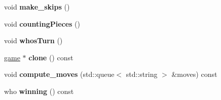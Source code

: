 \begin{DoxyCompactItemize}
\item 
void {\bfseries make\+\_\+skips} ()\hypertarget{classmain__savitch__14_1_1_othello_a3177234195a490eef52343d957e64b5d}{}\label{classmain__savitch__14_1_1_othello_a3177234195a490eef52343d957e64b5d}

\item 
void {\bfseries counting\+Pieces} ()\hypertarget{classmain__savitch__14_1_1_othello_a19f49edfbe82b84922877e00bc854ed8}{}\label{classmain__savitch__14_1_1_othello_a19f49edfbe82b84922877e00bc854ed8}

\item 
void {\bfseries whos\+Turn} ()\hypertarget{classmain__savitch__14_1_1_othello_a21440dbb4511812a76c578a5f546710b}{}\label{classmain__savitch__14_1_1_othello_a21440dbb4511812a76c578a5f546710b}

\item 
\hyperlink{classmain__savitch__14_1_1game}{game} $\ast$ {\bfseries clone} () const \hypertarget{classmain__savitch__14_1_1_othello_ab5a505f8a6ffd860376bf074c57e8a5f}{}\label{classmain__savitch__14_1_1_othello_ab5a505f8a6ffd860376bf074c57e8a5f}

\item 
void {\bfseries compute\+\_\+moves} (std\+::queue$<$ std\+::string $>$ \&moves) const \hypertarget{classmain__savitch__14_1_1_othello_aae15562565348c574b8e4c0b7782d19f}{}\label{classmain__savitch__14_1_1_othello_aae15562565348c574b8e4c0b7782d19f}

\item 
who {\bfseries winning} () const \hypertarget{classmain__savitch__14_1_1_othello_a8934d1b63f73c03dae9629dbe03955d7}{}\label{classmain__savitch__14_1_1_othello_a8934d1b63f73c03dae9629dbe03955d7}

\end{DoxyCompactItemize}
